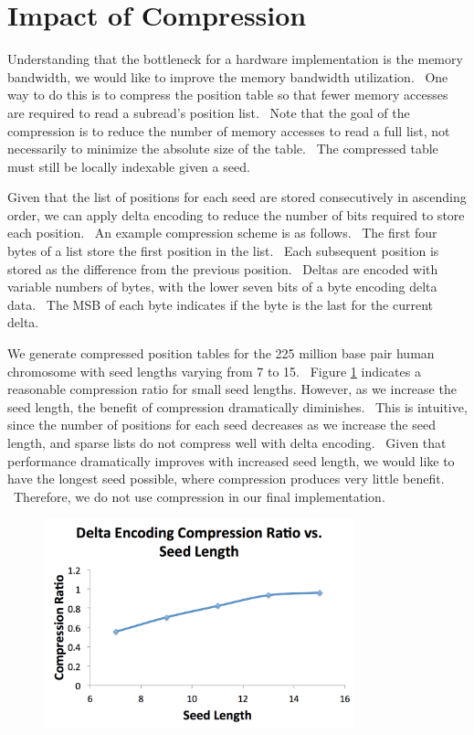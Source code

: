 \documentclass[11pt]{article}
\begin{document}
\section{Impact of Compression}
Understanding that the bottleneck for a hardware implementation is the memory bandwidth, we would like to improve the memory bandwidth utilization.  One way to do this is to compress the position table so that fewer memory accesses are required to read a subread’s position list.  Note that the goal of the compression is to reduce the number of memory accesses to read a full list, not necessarily to minimize the absolute size of the table.  The compressed table must still be locally indexable given a seed.

Given that the list of positions for each seed are stored consecutively in ascending order, we can apply delta encoding to reduce the number of bits required to store each position.  An example compression scheme is as follows.  The first four bytes of a list store the first position in the list.  Each subsequent position is stored as the difference from the previous position.  Deltas are encoded with variable numbers of bytes, with the lower seven bits of a byte encoding delta data.  The MSB of each byte indicates if the byte is the last for the current delta.

We generate compressed position tables for the 225 million base pair human chromosome with seed lengths varying from 7 to 15.  Figure \ref{compratio} indicates a reasonable compression ratio for small seed lengths. However, as we increase the seed length, the benefit of compression dramatically diminishes.  This is intuitive, since the number of positions for each seed decreases as we increase the seed length, and sparse lists do not compress well with delta encoding.  Given that performance dramatically improves with increased seed length, we would like to have the longest seed possible, where compression produces very little benefit.  Therefore, we do not use compression in our final implementation.
\begin{figure}[ht!]
\centering
\includegraphics[width=90mm]{compratio.png}
\caption{}
\label{compratio}
\end{figure}
\end{document}

